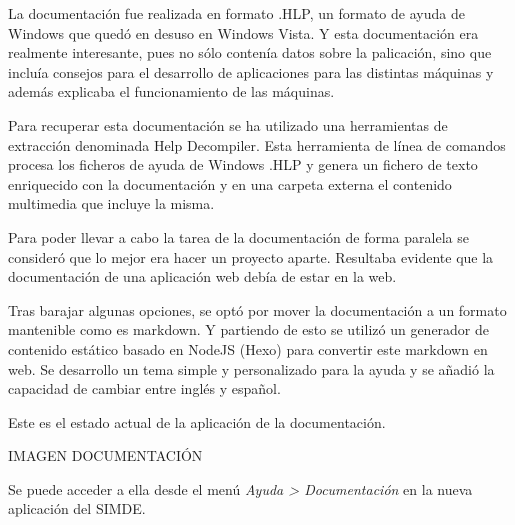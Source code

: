 \bigskip
La documentación fue realizada en formato .HLP, un formato de ayuda de Windows que quedó
en desuso en Windows Vista. Y esta documentación era realmente interesante, pues no sólo
contenía datos sobre la palicación, sino que incluía consejos para el desarrollo de 
aplicaciones para las distintas máquinas y además explicaba el funcionamiento de las máquinas.

\bigskip
Para recuperar esta documentación se ha utilizado una herramientas de extracción denominada
Help Decompiler. Esta herramienta de línea de comandos procesa los ficheros de ayuda de
Windows .HLP y genera un fichero de texto enriquecido con la documentación y en una carpeta
externa el contenido multimedia que incluye la misma.

\bigskip
Para poder llevar a cabo la tarea de la documentación de forma paralela se consideró que lo mejor era
hacer un proyecto aparte. Resultaba evidente que la documentación de una aplicación web debía de estar en la
web. 

\bigskip
Tras barajar algunas opciones, se optó por mover la documentación a un formato mantenible como 
es markdown. Y partiendo de esto se utilizó un generador de contenido estático basado en NodeJS (Hexo)
para convertir este markdown en web. Se desarrollo un tema simple y personalizado para la ayuda y se 
añadió la capacidad de cambiar entre inglés y español.

\bigskip
Este es el estado actual de la aplicación de la documentación.

    IMAGEN DOCUMENTACIÓN

\bigskip
Se puede acceder a ella desde el menú \textit{Ayuda > Documentación} en la nueva aplicación del SIMDE.
